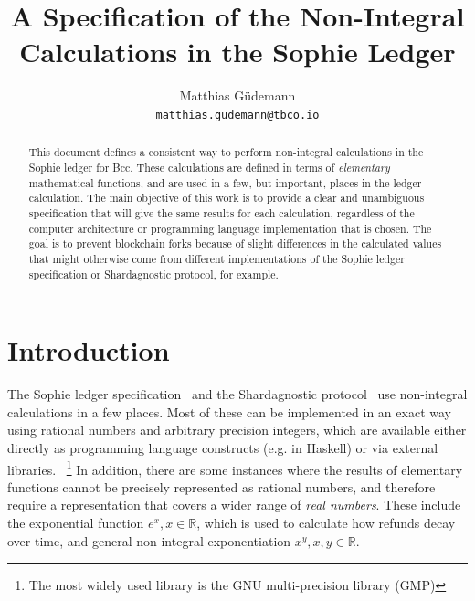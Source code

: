 \documentclass[11pt,a4paper,dvipsnames,twosided]{article}
\newcommand{\khcomment}[1]{\todo[color=blue!20]{KH: #1}}
\theoremstyle{definition}
\theoremstyle{definition}
\begin{document}
\cleardoublepage
\renewcommand{\thepage}{\arabic{page}}
\setcounter{page}{1}

\title{A Specification of the Non-Integral Calculations in the Sophie Ledger}

\author{Matthias G\"udemann  \\ {\small \texttt{matthias.gudemann@tbco.io}}}


\maketitle

\begin{abstract}
  This document defines a consistent way to perform non-integral calculations in
  the Sophie ledger for Bcc. These calculations are defined in terms of
  \emph{elementary} mathematical functions, and are used in a few, but
  important, places in the ledger calculation.  The main objective of this work
  is to provide a clear and unambiguous specification that will give the same
  results for each calculation, regardless of the computer architecture or
  programming language implementation that is chosen.  The goal is to prevent
  blockchain forks because of slight differences in the calculated values that
  might otherwise come from different implementations of the Sophie ledger
  specification or Shardagnostic protocol, for example.
\end{abstract}

\tableofcontents
\listoffigures

\section{Introduction}
\label{sec:introduction}

The Sophie ledger specification~\cite{sophie_spec} and the Shardagnostic
protocol~\cite{shardagnostic} use non-integral calculations in a few places. Most of
these can be implemented in an exact way using rational numbers and arbitrary
precision integers, which are available either directly as programming language
constructs (e.g. in Haskell) or via external libraries.~ \footnote{The most
  widely used library is the GNU multi-precision library (GMP)}
%
In addition, there are some instances where the results of elementary functions
cannot be precisely represented as rational numbers, and therefore require a
representation that covers a wider range of \emph{real numbers}.  These include
the exponential function $e^{x}, x \in \mathbb{R}$, which is used to calculate
how refunds decay over time, and general non-integral exponentiation
$x^{y}, x, y \in \mathbb{R}$. %
\end{document}
